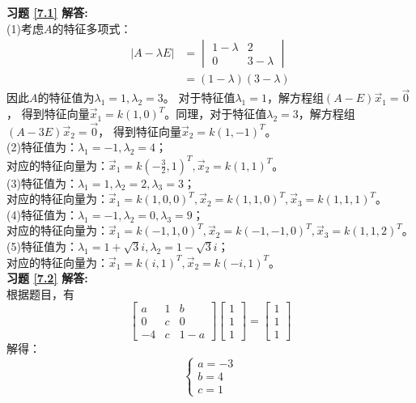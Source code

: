 \documentclass[a4paper]{book}
\begin{document}
\textbf{习题 \ref{7.1} 解答:}\\
(1)考虑$A$的特征多项式：
\begin{align*}
  |A-\lambda E|&=\begin{vmatrix}1-\lambda&2\\0&3-\lambda\end{vmatrix}\\
   & =(1-\lambda)(3-\lambda)
\end{align*}
因此$A$的特征值为$\lambda_1=1,\lambda_2=3$。 对于特征值$\lambda_1=1$，解方程组$(A-E)\vec{x}_1=\vec{0}$，
得到特征向量$\vec{x}_1=k(1,0)^T$。同理，对于特征值$\lambda_2=3$，解方程组$(A-3E)\vec{x}_2=\vec{0}$，
得到特征向量$\vec{x}_2=k(1,-1)^T$。\\
(2)特征值为：$\lambda_1=-1,\lambda_2=4$；\\
对应的特征向量为：$\vec{x}_1=k(-\frac{3}{2},1)^T,\vec{x}_2=k(1,1)^T$。\\
(3)特征值为：$\lambda_1=1,\lambda_2=2,\lambda_3=3$；\\
对应的特征向量为：$\vec{x}_1=k(1,0,0)^T,\vec{x}_2=k(1,1,0)^T,\vec{x}_3=k(1,1,1)^T$。\\
(4)特征值为：$\lambda_1=-1,\lambda_2=0,\lambda_3=9$；\\
对应的特征向量为：$\vec{x}_1=k(-1,1,0)^T,\vec{x}_2=k(-1,-1,0)^T,\vec{x}_3=k(1,1,2)^T$。\\
(5)特征值为：$\lambda_1=1+\sqrt{3}i,\lambda_2=1-\sqrt{3}i$；\\
对应的特征向量为：$\vec{x}_1=k(i,1)^T,\vec{x}_2=k(-i,1)^T$。\\
\textbf{习题 \ref{7.2} 解答:}\\
根据题目，有
\begin{equation*}
  \begin{bmatrix}a&1&b\\0&c&0\\-4&c&1-a\end{bmatrix}
  \begin{bmatrix}1\\1\\1\end{bmatrix}=
  \begin{bmatrix}1\\1\\1\end{bmatrix}
\end{equation*}
解得：
\begin{equation*}
  \begin{cases}
  a = -3\\
  b = 4\\
  c = 1
  \end{cases}
\end{equation*}
\end{document}
